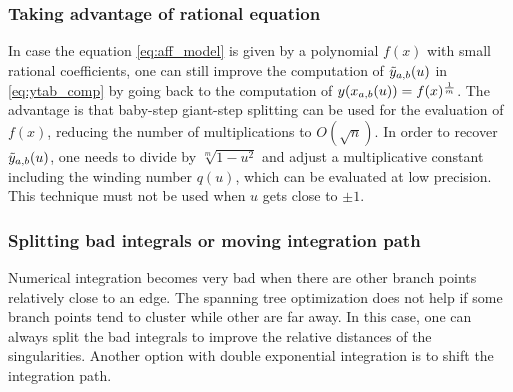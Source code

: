 \documentclass[main.tex]{subfiles}
\begin{document}
    \subsubsection{Taking advantage of rational equation}

    In case the equation \eqref{eq:aff_model} is given by a polynomial $f(x)$
    with small rational coefficients, one can still improve the computation
    of $\tilde{y}_{a,b}(u)$ in \eqref{eq:ytab_comp} by going back to
    the computation of $y(x_{a,b}(u))=f(x)^{\frac1m}$.
    The advantage is that baby-step giant-step splitting can be used for
    the evaluation of $f(x)$, reducing the number of multiplications to
    $O(\sqrt{n})$. In order to recover $\tilde{y}_{a,b}(u)$, one needs to divide by
    $\sqrt[m]{1-u^2}$ and adjust a multiplicative constant including
    the winding number $q(u)$, which can be evaluated at low precision.
    This technique must not be used when $u$ gets close to $\pm1$.

    \subsubsection{Splitting bad integrals or moving integration path}

    Numerical integration becomes very bad when there are other branch points
    relatively close to an edge. The spanning tree optimization does not help
    if some branch points tend to cluster while other are far away.
    In this case, one can always split the bad integrals to improve the
    relative distances of the singularities. Another option with
    double exponential integration is to shift the integration path.

\biblio
\end{document}
